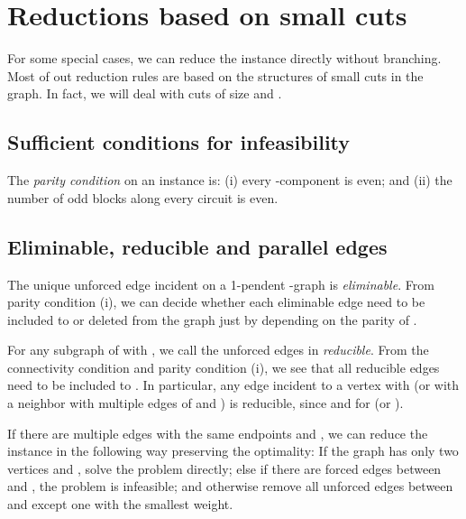 \documentclass[runningheads]{llncs}
\begin{document}
\section{Reductions based on small cuts}
For some special cases, we can reduce the instance directly without branching.
Most of out reduction rules are based on the structures of small cuts in the graph.
In fact, we will deal with cuts of size  and .

\subsection{Sufficient conditions for infeasibility}
The {\em parity condition} on an instance is:
(i)  every -component is even; and
(ii)  the number of odd blocks along every circuit is even.


\subsection{Eliminable, reducible and parallel edges}
The unique unforced edge incident on a 1-pendent -graph is \emph{eliminable}.
From parity condition (i), we can decide whether each eliminable edge need to be included to  or deleted from the graph
just by depending on the parity of .


For any subgraph  of  with ,
we call the unforced edges in  {\em reducible}.
From the connectivity condition and parity condition (i),
we see that all reducible edges need to be included to .
In particular, any edge  incident to a vertex  with 
(or with a neighbor  with multiple edges
of  and ) is reducible,
since  and 
 for  (or ).


If there are multiple edges with the same endpoints  and , we can reduce the instance in the following way
 preserving the optimality:
 If the graph has only two vertices  and , solve the problem directly; else if there are forced edges between  and , the problem is infeasible; and otherwise remove all unforced edges between  and  except one with the smallest weight.
\end{document}
